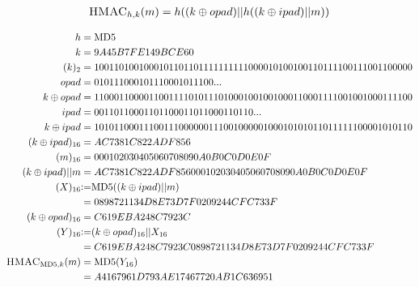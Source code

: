 \begin{align}
\textsc{HMAC}_{h, k}(m) = h( ( k \oplus opad ) || h( ( k \oplus ipad ) || m ) )
\end{align}

\begin{align*}
h &= \text{MD$5$} \\
k &= 9A45B7FE149BCE60 \\
(k)_2&= 1001 1010 0100 0101 1011 0111 1111 1110 0001 0100 1001 1011 1100 1110 0110 0000 \\
opad &= 010 111 000 101 110 001 011 100 ... \\
k \oplus opad &= 1100 0110 0001 1001 1110 1011 1010 0010 0100 1000 1100 0111 1001 0010 0011 1100 \\
ipad &= 0011 0110 0011 0110 0011 0110 0011 0110 ... \\
k \oplus ipad &= 1010 1100 0111 0011 1000 0001 1100 1000 0010 0010 1010 1101 1111 1000 0101 0110 \\
(k \oplus ipad)_{16} &= AC7381C822ADF856 \\
(m)_{16} &= 000102030405060708090A0B0C0D0E0F \\
(k \oplus ipad) || m &= AC7381C822ADF856000102030405060708090A0B0C0D0E0F \\
(X)_{16} &{:=} \text{MD$5$}( (k \oplus ipad) || m ) \\
&= 0898721134D8E73D7F0209244CFC733F \\
(k \oplus opad)_{16} &= C619EBA248C7923C \\
(Y)_{16} &{:=} (k \oplus opad)_{16} || X_{16} \\
&= C619EBA248C7923C0898721134D8E73D7F0209244CFC733F \\
\textsc{HMAC}_{\text{MD$5$}, k}(m) &= \text{MD$5$}( Y_{16} ) \\
&= A4167961D793AE17467720AB1C636951
\end{align*}